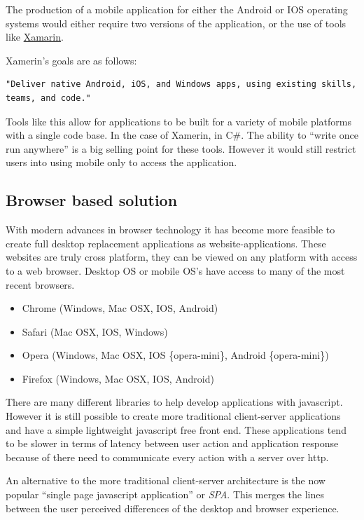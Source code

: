 The production of a mobile application for either the Android or IOS operating
systems would either require two versions of the application, or the use of
tools like \href{https://www.xamarin.com/platform}{Xamarin}.

Xamerin's goals are as follows:
\begin{verbatim}
"Deliver native Android, iOS, and Windows apps, using existing skills,
teams, and code."
\end{verbatim}\cite{Xamerin}

Tools like this allow for applications to be built for a variety of mobile
platforms with a single code base. In the case of Xamerin, in C\#. The ability
to ``write once run anywhere'' is a big selling point for these tools. However
it would still restrict users into using mobile only to access the application.

\subsection{Browser based solution}\label{browser-based-solution}

With modern advances in browser technology it has become more feasible to create
full desktop replacement applications as website-applications. These websites
are truly cross platform, they can be viewed on any platform with access to a
web browser. Desktop OS or mobile OS's have access to many of the most
recent browsers.

\begin{itemize}
  \item Chrome (Windows, Mac OSX, IOS, Android)
  \item Safari (Mac OSX, IOS, Windows)
  \item Opera (Windows, Mac OSX, IOS \{opera-mini\}, Android \{opera-mini\})
  \item Firefox (Windows, Mac OSX, IOS, Android)
\end{itemize}

There are many different libraries to help develop applications with javascript.
However it is still possible to create more traditional client-server
applications and have a simple lightweight javascript free front end. These
applications tend to be slower in terms of latency between user action and
application response because of there need to communicate every action with a
server over http.

An alternative to the more traditional client-server architecture is the
now popular ``single page javascript application'' or \emph{SPA}. This merges the
lines between the user perceived differences of the desktop and browser
experience.

